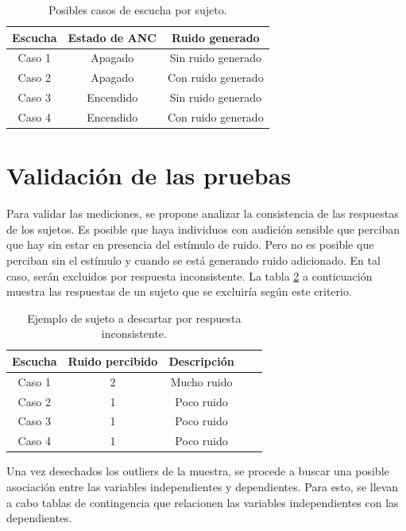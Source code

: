 \documentclass[a4paper,12pt]{article}
\begin{document}
\begin{table}[ht]
\centering
\begin{tabular}{|c|c|c|}
  \hline
  \textbf{Escucha} & \textbf{Estado de ANC} & \textbf{Ruido generado} \\
  \hline
  Caso 1 & Apagado & Sin ruido generado \\
  \hline
  Caso 2 & Apagado & Con ruido generado \\
  \hline
  Caso 3 & Encendido & Sin ruido generado \\
  \hline
  Caso 4 & Encendido & Con ruido generado \\
  \hline
\end{tabular}
\caption{Posibles casos de escucha por sujeto.}
\label{tab:cases}
\end{table}

\section{Validación de las pruebas}
\label{sec:validation}

Para validar las mediciones, se propone analizar la consistencia de las respuestas de los sujetos.
Es posible que haya individuos con audición sensible que perciban que hay  sin estar en presencia del estímulo de ruido.
Pero no es posible que perciban  sin el estímulo y  cuando se está generando ruido adicionado.
En tal caso, serán excluidos por respuesta inconsistente.
La tabla \ref{tab:outlier} a conticuación muestra las respuestas de un sujeto que se excluiría según este criterio.

\begin{table}[ht]
    \centering
    \begin{tabular}{|c|c|c|c|c|}
      \hline
      \textbf{Escucha} & \textbf{Ruido percibido} & \textbf{Descripción} \\
      \hline
      Caso 1 & 2 & Mucho ruido \\
      \hline
      Caso 2 & 1 & Poco ruido \\
      \hline
      Caso 3 & 1 & Poco ruido \\
      \hline
      Caso 4 & 1 & Poco ruido \\
      \hline
\end{tabular}
\caption{Ejemplo de sujeto a descartar por respuesta inconsistente.}
\label{tab:outlier}
\end{table}

Una vez desechados los outliers de la muestra, se procede a buscar una posible asociación entre las variables independientes y dependientes.
Para esto, se llevan a cabo tablas de contingencia que relacionen las variables independientes con las dependientes.
\end{document}
